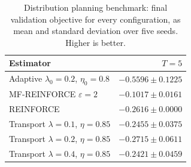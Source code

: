 \begin{table}[H]
\centering
\begin{tabular}{lr}
\toprule
Estimator & $T=5$ \\
\midrule
Adaptive $\lambda_0=0.2$, $\eta_0=0.8$ & $-0.5596\pm0.1225$ \\
MF-REINFORCE $\varepsilon=2$ & $-0.1017\pm0.0161$ \\
REINFORCE & $-0.2616\pm0.0000$ \\
Transport $\lambda=0.1$, $\eta=0.85$ & $-0.2455\pm0.0375$ \\
Transport $\lambda=0.2$, $\eta=0.85$ & $-0.2715\pm0.0611$ \\
Transport $\lambda=0.4$, $\eta=0.85$ & $-0.2421\pm0.0459$ \\
\bottomrule
\end{tabular}
\caption{Distribution planning benchmark: final validation objective for every configuration, as mean and standard deviation over five seeds. Higher is better.}
\label{tab:full-objectives-distribution}
\end{table}
